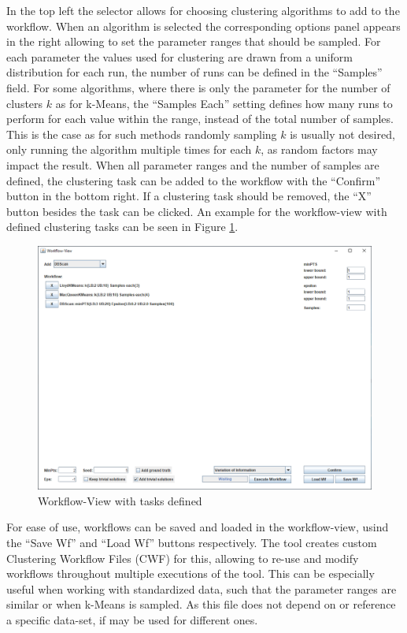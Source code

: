 \documentclass[
	a4paper,
	english,
	twoside,
	openright,               
	11pt                            
	]{report}
\begin{document}
In the top left the selector allows for choosing clustering algorithms to add to the workflow. When an algorithm is selected the corresponding options panel appears in the right allowing to set the parameter ranges that should be sampled. For each parameter the values used for clustering are drawn from a uniform distribution for each run, the number of runs can be defined in the ``Samples'' field. For some algorithms, where there is only the parameter for the number of clusters $k$ as for k-Means, the ``Samples Each'' setting defines how many runs to perform for each value within the range, instead of the total number of samples. This is the case as for such methods randomly sampling $k$ is usually not desired, only running the algorithm multiple times for each $k$, as random factors may impact the result. When all parameter ranges and the number of samples are defined, the clustering task can be added to the workflow with the ``Confirm'' button in the bottom right. If a clustering task should be removed, the ``X'' button besides the task can be clicked. An example for the workflow-view with defined clustering tasks can be seen in Figure \ref{fig:workflow-view-tasks}.

\begin{figure}[h]
	\centering
	\includegraphics[scale=.43]{workflow-view-tasks}
	\caption{Workflow-View with tasks defined}
	\label{fig:workflow-view-tasks}
\end{figure}

For ease of use, workflows can be saved and loaded in the workflow-view, usind the ``Save Wf'' and ``Load Wf'' buttons respectively. The tool creates custom Clustering Workflow Files (CWF) for this, allowing to re-use and modify workflows throughout multiple executions of the tool. This can be especially useful when working with standardized data, such that the parameter ranges are similar or when k-Means is sampled. As this file does not depend on or reference a specific data-set, if may be used for different ones.
\end{document}
